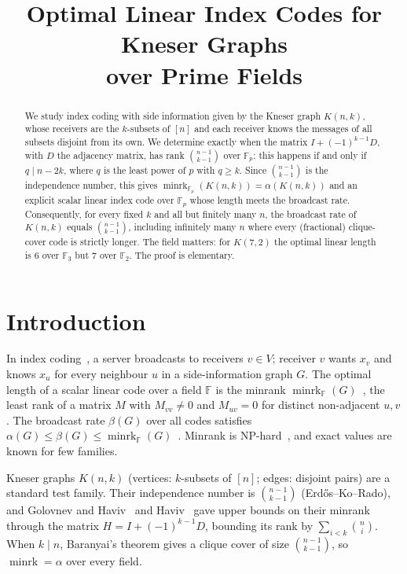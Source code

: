 \documentclass[conference]{IEEEtran}
\theoremstyle{remark}
\newcommand{\F}{\mathbb{F}}
\newcommand{\minrk}{\operatorname{minrk}}
\begin{document}
\title{Optimal Linear Index Codes for Kneser Graphs\\ over Prime Fields}
\author{
}
\maketitle

\begin{abstract}
We study index coding with side information given by the Kneser graph $K(n,k)$, whose receivers are the $k$-subsets of
$[n]$ and each receiver knows the messages of all subsets disjoint from its own. We determine exactly when the
matrix $I+(-1)^{k-1}D$, with $D$ the adjacency matrix, has rank $\binom{n-1}{k-1}$ over $\F_p$: this happens if and only
if $q\mid n-2k$, where $q$ is the least power of $p$ with $q\ge k$. Since $\binom{n-1}{k-1}$ is the independence number,
this gives $\minrk_{\F_p}(K(n,k))=\alpha(K(n,k))$ and an explicit scalar linear index code over $\F_p$ whose length meets
the broadcast rate. Consequently, for every fixed $k$ and all but finitely many $n$, the broadcast rate of $K(n,k)$ equals
$\binom{n-1}{k-1}$, including infinitely many $n$ where every (fractional) clique-cover code is strictly longer. The field
matters: for $K(7,2)$ the optimal linear length is $6$ over $\F_3$ but $7$ over $\F_2$. The proof is elementary.
\end{abstract}

\section{Introduction}
In index coding~\cite{BBJK}, a server broadcasts to receivers $v\in V$; receiver $v$ wants $x_v$ and knows $x_u$ for every
neighbour $u$ in a side-information graph $G$. The optimal length of a scalar linear code over a field $\F$ is the minrank
$\minrk_\F(G)$~\cite{BBJK}, the least rank of a matrix $M$ with $M_{vv}\ne0$ and $M_{uv}=0$ for distinct non-adjacent $u,v$.
The broadcast rate $\beta(G)$ over all codes satisfies $\alpha(G)\le\beta(G)\le\minrk_\F(G)$~\cite{BKL}. Minrank is
NP-hard~\cite{Peeters}, and exact values are known for few families.

Kneser graphs $K(n,k)$ (vertices: $k$-subsets of $[n]$; edges: disjoint pairs) are a standard test family. Their
independence number is $\binom{n-1}{k-1}$ (Erd\H{o}s--Ko--Rado), and Golovnev and Haviv~\cite{GH} and Haviv~\cite{Haviv} gave
upper bounds on their minrank through the matrix $H=I+(-1)^{k-1}D$, bounding its rank by $\sum_{i<k}\binom ni$. When
$k\mid n$, Baranyai's theorem gives a clique cover of size $\binom{n-1}{k-1}$, so $\minrk=\alpha$ over every field.
\end{document}
